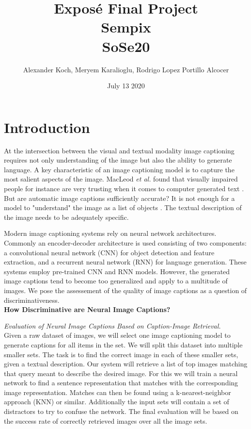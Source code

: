 \documentclass[12pt]{article}
\title{Exposé Final Project \\ \small{Sempix} \\ \small{SoSe20}}
\author{Alexander Koch, Meryem Karalioglu, Rodrigo Lopez Portillo Alcocer}
\date{July 13 2020}
\begin{document}
\maketitle	



\section{Introduction}

At the intersection between the visual and textual modality image captioning requires not only understanding of the image but also the ability to generate language.
A key characteristic of an image captioning model is to capture the most salient aspects of the image.
MacLeod \textit{et al.} found that visually impaired people for instance are very trusting when it comes to computer generated text \cite{blind}.
But are automatic image captions sufficiently accurate?
It is not enough for a model to "understand" the image as a list of objects \cite{bernardi2016automatic}.
The textual description of the image needs to be adequately specific.

Modern image captioning systems rely on neural network architectures. 
Commonly an encoder-decoder architecture is used consisting of two components: a convolutional neural network (CNN) for object detection and feature extraction, and a recurrent neural network (RNN) for language generation. These systems employ pre-trained CNN and RNN models. 
However, the generated image captions tend to become too generalized and apply to a multitude of images.
We pose the assessement of the quality of image captions as a question of discriminativeness.\\



\textbf{How Discriminative are Neural Image Captions?}

\textit{Evaluation of Neural Image Captions Based on Caption-Image Retrieval.}\\


Given a raw dataset of images, we will select one image captioning model to generate captions for all items in the set. We will split this dataset into multiple smaller sets. The task is to find the correct image in each of these smaller sets, given a textual description. 
Our system will retrieve a list of top images matching that query meant to describe the desired image. For this we will train a neural network to find a sentence representation that matches with the corresponding image representation. 
Matches can then be found using a k-nearest-neighbor approach (KNN) or similar. Additionally the input sets will contain a set of distractors to try to confuse the network. 
The final evaluation will be based on the success rate of correctly retrieved images over all the image sets.
\end{document}
